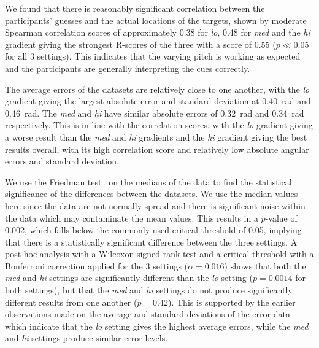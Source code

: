 \documentclass[sigconf, review=true, screen=true, anonymous=true]{acmart}
\begin{document}
We found that there is reasonably significant correlation between the participants' guesses and the actual locations of the targets, shown by moderate Spearman correlation scores of approximately 0.38 for \emph{lo}, 0.48 for \emph{med} and the \emph{hi} gradient giving the strongest R-scores of the three with a score of 0.55 ($p \ll 0.05$ for all 3 settings).
This indicates that the varying pitch is working as expected and the participants are generally interpreting the cues correctly. 

The average errors of the datasets are relatively close to one another, with the \emph{lo} gradient giving the largest absolute error and standard deviation at \SI{0.40}{\radian} and \SI{0.46}{\radian}.
The \emph{med} and \emph{hi} have similar absolute errors of \SI{0.32}{\radian} and \SI{0.34}{\radian} respectively.
This is in line with the correlation scores, with the \emph{lo} gradient giving a worse result than the \emph{med} and \emph{hi} gradients and the \emph{hi} gradient giving the best results overall, with its high correlation score and relatively low absolute angular errors and standard deviation. 

We use the Friedman test~\cite{friedman1937use} on the medians of the data to find the statistical significance of the differences between the datasets.
We use the median values here since the data are not normally spread and there is significant noise within the data which may contaminate the mean values.
This results in a $p$-value of 0.002, which falls below the commonly-used critical threshold of 0.05, implying that there is a statistically significant difference between the three settings.
A post-hoc analysis with a Wilcoxon signed rank test and a critical threshold with a Bonferroni correction applied for the 3 settings ($\alpha=0.016$) shows that both the \emph{med} and \emph{hi} settings are significantly different than the \emph{lo} setting ($p=0.0014$ for both settings), but that the \emph{med} and \emph{hi} settings do not produce significantly different results from one another ($p=0.42$).
This is supported by the earlier observations made on the average and standard deviations of the error data which indicate that the \emph{lo} setting gives the highest average errors, while the \emph{med} and \emph{hi} settings produce similar error levels. 
\end{document}
